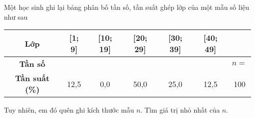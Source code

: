 \begin{bt}%
Một học sinh ghi lại bảng phân bố tần số, tần suất ghép lớp của một mẫu số liệu như sau
\begin{center}
\begin{tabular}{|c|c|c|c|c|c|c|}
\hline
\bf Lớp  & [1; 9] & [10; 19] & [20; 29] & [30; 39] & [40; 49] & \\
\hline
\bf Tần số & & & & & & $n =$\\
\hline
\bf Tần suất (\%) & 12,5 & 0,0 & 50,0 & 25,0 & 12,5 & 100\\
\hline
\end{tabular}
\end{center}
Tuy nhiên, em đó quên ghi kích thước mẫu $n$. Tìm giá trị nhỏ nhất của $n$.
\end{bt}